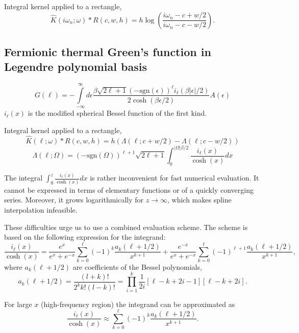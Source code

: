 \documentclass[]{article}
\begin{document}
Integral kernel applied to a rectangle,
\begin{equation}
	\hat K(i\omega_n;\omega)*R(c,w,h) =
	h \log\left(\frac{i\omega_n - c + w/2}{i\omega_n - c - w/2}\right).
\end{equation}

\subsection{Fermionic thermal Green's function in Legendre polynomial basis}
\label{fermiongf_legendre}
\begin{equation}
	G(\ell) = -\int\limits_{-\infty}^\infty
	d\epsilon \frac{\beta\sqrt{2\ell+1}(-\mathrm{sgn}(\epsilon))^\ell i_{\ell}(\beta|\epsilon|/2)}
	{2\cosh(\beta\epsilon/2)} A(\epsilon)
\end{equation}
$i_\ell(x)$ is the modified spherical Bessel function of the first kind.

Integral kernel applied to a rectangle,
\begin{equation}
	\hat K(\ell;\omega)*R(c,w,h) = h (\Lambda(\ell;c+w/2) - \Lambda(\ell;c-w/2))
\end{equation}
\begin{equation}
	\Lambda(\ell;\Omega) = (-\mathrm{sgn}(\Omega))^{\ell+1}\sqrt{2\ell+1}
	\int_0^{|\Omega|\beta/2} \frac{i_\ell(x)}{\cosh(x)} dx
\end{equation}

The integral $\int_0^z \frac{i_\ell(x)}{\cosh(x)} dx$ is rather inconvenient for fast numerical evaluation. It cannot be expressed in terms of elementary functions or of a quickly converging series. Moreover, it grows logarithmically for $z\to\infty$, which makes spline interpolation infeasible.

These difficulties urge us to use a combined evaluation scheme. The scheme is based on the following expression for the integrand:
\begin{equation}\label{il_cosh_series}
	\frac{i_\ell(x)}{\cosh(x)} =
	\frac{e^x}{e^x+e^{-x}}\sum_{k=0}^\ell(-1)^k
		\frac{a_k(\ell+1/2)}{x^{k+1}} +
	\frac{e^{-x}}{e^x+e^{-x}}\sum_{k=0}^\ell(-1)^{\ell+1}
		\frac{a_k(\ell+1/2)}{x^{k+1}},
\end{equation}
where $a_k(\ell+1/2)$ are coefficients of the Bessel polynomials,
\begin{equation}
	a_k(\ell+1/2) = \frac{(l+k)!}{2^k k!(l-k)!} =
	\prod_{i=1}^k \frac{1}{2i}[\ell-k+2i-1][\ell-k+2i].
\end{equation}

For large $x$ (high-frequency region) the integrand can be approximated as
\begin{equation}\label{il_cosh_series_high}
	\frac{i_\ell(x)}{\cosh(x)} \approx
		\sum_{k=0}^\ell(-1)^k \frac{a_k(\ell+1/2)}{x^{k+1}}.
\end{equation}
\end{document}
